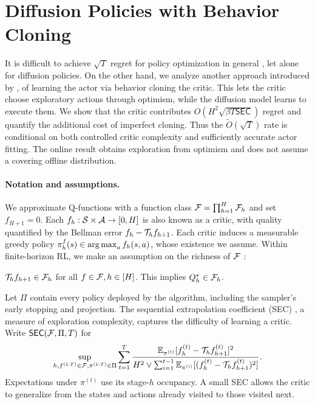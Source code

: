 


\section{Diffusion Policies with Behavior Cloning}
\label{sec:behavior-clone}
It is difficult to achieve $\sqrt{T}$ regret for policy optimization in general \citep{sherman2023rate, tan2025actor}, let alone for diffusion policies. On the other hand, we analyze another approach introduced by \citet{ li2024learningmultimodalbehaviorsscratch, yang2023policyrepresentationdiffusionprobability}, of learning the actor via behavior cloning the critic. This lets the critic choose exploratory actions through optimism, while the diffusion model learns to execute them. We show that the critic contributes $O(H^2\sqrt{\beta T\mathsf{SEC}})$ regret and quantify the additional cost of imperfect cloning. Thus the $\widetilde O(\sqrt T)$ rate is conditional on both controlled critic complexity and sufficiently accurate actor fitting. The online result obtains exploration from optimism and does not assume a covering offline distribution.

\paragraph{Notation and assumptions.} We approximate Q-functions with a function class ${\mathcal{F}}=\prod_{h=1}^H{\mathcal{F}}_h$ and set $f_{H+1}=0$. Each $f_h : {\mathcal{S}} \times {\mathcal{A}} \to [0,H]$ is also known as a critic, with quality quantified by the Bellman error $f_h - {\mathcal{T}}_h f_{h+1}$. Each critic induces a measurable greedy policy $\pi_h^f(s)\in\operatorname*{arg\,max}_a f_h(s,a)$, whose existence we assume. Within finite-horizon RL, we make an assumption on the richness of ${\mathcal{F}}$ \citep{jin2021bellmaneluder, rashidinejad2021bridging, xie2022role}:
\begin{aspt}[Completeness]
    ${\mathcal{T}}_h f_{h+1} \in {\mathcal{F}}_h$ for all $f \in {\mathcal{F}}, h \in [H]$. This implies $Q_h^* \in {\mathcal{F}}_h$.
    \label{aspt:completeness}
\end{aspt}
Let $\Pi$ contain every policy deployed by the algorithm, including the sampler's early stopping and projection. The sequential extrapolation coefficient (SEC) \citep{xie2022role}, a measure of exploration complexity, captures the difficulty of learning a critic. Write $\mathsf{SEC}({\mathcal{F}},\Pi,T)$ for
\[
 \sup_{h, f^{(1:T)}\in{\mathcal{F}},\pi^{(1:T)}\in\Pi}
 \sum_{t=1}^T\frac{\mathbb{E}_{\pi^{(t)}}[f_h^{(t)}-{\mathcal{T}}_hf_{h+1}^{(t)}]^2}
 {H^2\vee\sum_{i=1}^{t-1}\mathbb{E}_{\pi^{(i)}}[(f_h^{(t)}-{\mathcal{T}}_hf_{h+1}^{(t)})^2]}.
\]
Expectations under $\pi^{(t)}$ use its stage-$h$ occupancy. A small SEC allows the critic to generalize from the states and actions already visited to those visited next.


